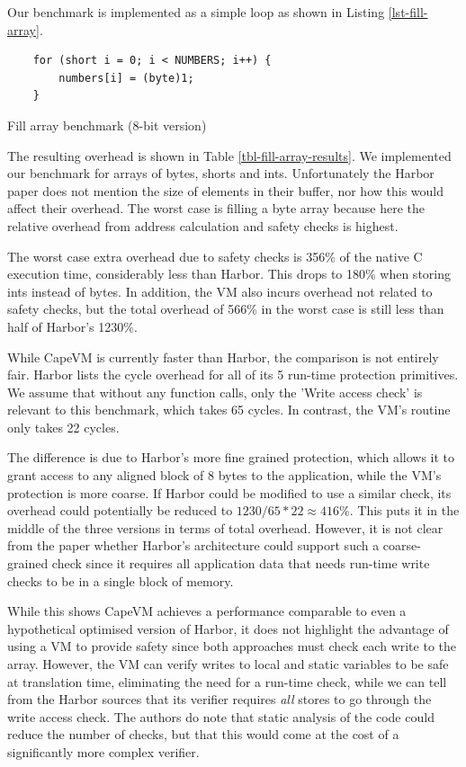 Our benchmark is implemented as a simple loop as shown in Listing \ref{lst-fill-array}.

\begin{listing}
\begin{verbatim}
    for (short i = 0; i < NUMBERS; i++) {
        numbers[i] = (byte)1;
    }
\end{verbatim}
\caption{Fill array benchmark (8-bit version)}
\label{lst-fill-array}
\end{listing}



The resulting overhead is shown in Table \ref{tbl-fill-array-results}. We implemented our benchmark for arrays of bytes, shorts and ints. Unfortunately the Harbor paper does not mention the size of elements in their buffer, nor how this would affect their overhead. The worst case is filling a byte array because here the relative overhead from address calculation and safety checks is highest.

The worst case extra overhead due to safety checks is 356\% of the native C execution time, considerably less than Harbor. This drops to 180\% when storing ints instead of bytes. In addition, the VM also incurs overhead not related to safety checks, but the total overhead of 566\% in the worst case is still less than half of Harbor's 1230\%.

While CapeVM is currently faster than Harbor, the comparison is not entirely fair. Harbor lists the cycle overhead for all of its 5 run-time protection primitives. We assume that without any function calls, only the 'Write access check' is relevant to this benchmark, which takes 65 cycles. In contrast, the VM's  routine only takes 22 cycles.

The difference is due to Harbor's more fine grained protection, which allows it to grant access to any aligned block of 8 bytes to the application, while the VM's protection is more coarse. If Harbor could be modified to use a similar check, its overhead could potentially be reduced to $1230 / 65 * 22 \approx 416\%$. This puts it in the middle of the three versions in terms of total overhead. However, it is not clear from the paper whether Harbor's architecture could support such a coarse-grained check since it requires all application data that needs run-time write checks to be in a single block of memory.

While this shows CapeVM achieves a performance comparable to even a hypothetical optimised version of Harbor, it does not highlight the advantage of using a VM to provide safety since both approaches must check each write to the array. However, the VM can verify writes to local and static variables to be safe at translation time, eliminating the need for a run-time check, while we can tell from the Harbor sources \cite{sos-operating-system} that its verifier requires \emph{all} stores to go through the write access check. The authors do note that static analysis of the code could reduce the number of checks, but that this would come at the cost of a significantly more complex verifier.

